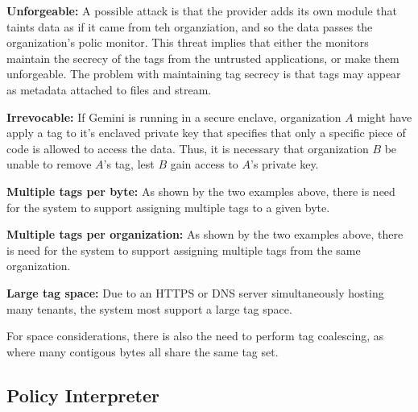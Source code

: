 \begin{widelist}
\item \textbf{Unforgeable:}
    A possible attack is that the provider adds its own module that taints data as
    if it came from teh organziation, and so the data passes the organization's
    polic monitor.
    This threat implies that either the monitors maintain the secrecy of the tags
    from the untrusted applications, or make them unforgeable.
    The problem with maintaining tag secrecy is that tags may appear as metadata
    attached to files and stream.

\item \textbf{Irrevocable:}
    If Gemini is running in a secure enclave, organization $A$ might have apply
    a tag to it's enclaved private key that specifies that only a specific
    piece of code is allowed to access the data.
    Thus, it is necessary that organization $B$ be unable to remove $A$'s tag,
    lest $B$ gain access to $A$'s private key.

\item \textbf{Multiple tags per byte:}
    As shown by the two examples above, there is need for the system to support
    assigning multiple tags to a given byte.

\item \textbf{Multiple tags per organization:}
    As shown by the two examples above, there is need for the system to support
    assigning multiple tags from the same organization.

\item \textbf{Large tag space:}
    Due to an HTTPS or DNS server simultaneously hosting many tenants, the
    system most support a large tag space.
\end{widelist}

For space considerations, there is also the need to perform tag coalescing, as where
many contigous bytes all share the same tag set.


\subsection{Policy Interpreter}



